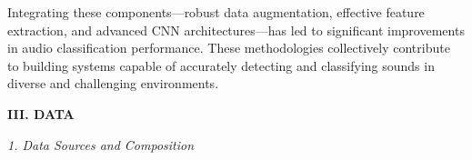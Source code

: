 \documentclass[12pt]{article}
\begin{document}
{Integrating these components—robust data augmentation, effective feature extraction, and advanced CNN architectures—has led to significant improvements in audio classification performance. These methodologies collectively contribute to building systems capable of accurately detecting and classifying sounds in diverse and challenging environments.

}

\begin{center}
{\fontsize{9}{11}\selectfont\bfseries III. DATA}
\end{center}

\begin{center}
{\fontsize{9}{11}\selectfont\textit{1. Data Sources and Composition}}
\end{center}

\vspace{0.2em}
\end{document}
